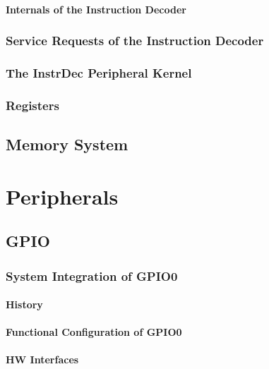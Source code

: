 \subsubsection{Internals of the Instruction Decoder}

\subsection{Service Requests of the Instruction Decoder}

\subsection{The InstrDec Peripheral Kernel}


\subsection{Registers}


\section{Memory System}
\label{sec:memfunc01}


\chapter{Peripherals}
\section{GPIO} %
\label{sec:gpiofunc01}
\subsection{System Integration of GPIO0}
\subsubsection{History}


\subsubsection{Functional Configuration of GPIO0}


\subsubsection{HW Interfaces}


